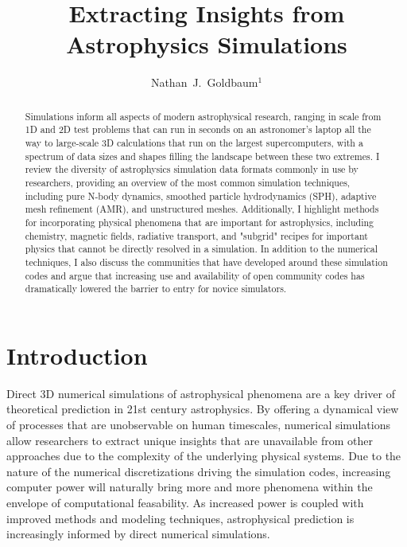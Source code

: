 \documentclass[11pt,twoside]{article}
\begin{document}
\title{Extracting Insights from Astrophysics Simulations}

\author{Nathan~J.~Goldbaum$^1$}



\begin{abstract}
Simulations inform all aspects of modern astrophysical research, ranging in scale from 1D and 2D test problems that can run in seconds on an astronomer's laptop all the way to large-scale 3D calculations that run on the largest supercomputers, with a spectrum of data sizes and shapes filling the landscape between these two extremes. I review the diversity of astrophysics simulation data formats commonly in use by researchers, providing an overview of the most common simulation techniques, including pure N-body dynamics, smoothed particle hydrodynamics (SPH), adaptive mesh refinement (AMR), and unstructured meshes. Additionally, I highlight methods for incorporating physical phenomena that are important for astrophysics, including chemistry, magnetic fields, radiative transport, and "subgrid" recipes for important physics that cannot be directly resolved in a simulation. In addition to the numerical techniques, I also discuss the communities that have developed around these simulation codes and argue that increasing use and availability of open community codes has dramatically lowered the barrier to entry for novice simulators.
\end{abstract}

\section{Introduction}
Direct 3D numerical simulations of astrophysical phenomena are a key driver of theoretical prediction in 21st century astrophysics. By offering a dynamical view of processes that are unobservable on human timescales, numerical simulations allow researchers to extract unique insights that are unavailable from other approaches due to the complexity of the underlying physical systems. Due to the nature of the numerical discretizations driving the simulation codes, increasing computer power will naturally bring more and more phenomena within the envelope of computational feasability. As increased power is coupled with improved methods and modeling techniques, astrophysical prediction is increasingly informed by direct numerical simulations.
\end{document}
